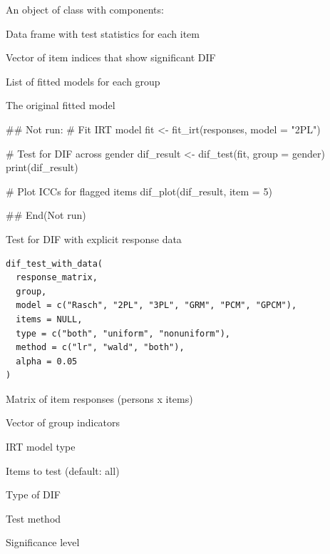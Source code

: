 \documentclass[a4paper]{book}
\begin{document}
%
\begin{Value}
An object of class  with components:
\begin{ldescription}
\item[\code{dif\_results}] Data frame with test statistics for each item
\item[\code{flagged\_items}] Vector of item indices that show significant DIF
\item[\code{group\_fits}] List of fitted models for each group
\item[\code{baseline\_fit}] The original fitted model
\end{ldescription}
\end{Value}
%
\begin{Examples}
\begin{ExampleCode}
## Not run: 
# Fit IRT model
fit <- fit_irt(responses, model = "2PL")

# Test for DIF across gender
dif_result <- dif_test(fit, group = gender)
print(dif_result)

# Plot ICCs for flagged items
dif_plot(dif_result, item = 5)

## End(Not run)

\end{ExampleCode}
\end{Examples}
%
\begin{Description}
Test for DIF with explicit response data
\end{Description}
%
\begin{Usage}
\begin{verbatim}
dif_test_with_data(
  response_matrix,
  group,
  model = c("Rasch", "2PL", "3PL", "GRM", "PCM", "GPCM"),
  items = NULL,
  type = c("both", "uniform", "nonuniform"),
  method = c("lr", "wald", "both"),
  alpha = 0.05
)
\end{verbatim}
\end{Usage}
%
\begin{Arguments}
\begin{ldescription}
\item[\code{response\_matrix}] Matrix of item responses (persons x items)

\item[\code{group}] Vector of group indicators

\item[\code{model}] IRT model type

\item[\code{items}] Items to test (default: all)

\item[\code{type}] Type of DIF

\item[\code{method}] Test method

\item[\code{alpha}] Significance level
\end{ldescription}
\end{Arguments}
\end{document}
